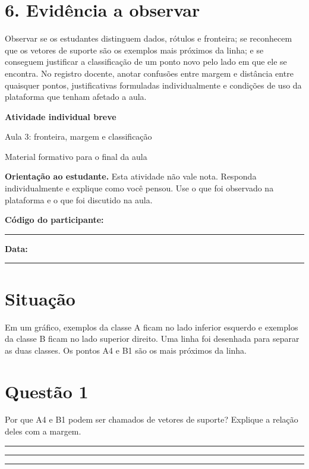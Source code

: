 \documentclass[12pt,a4paper]{article}
\newcommand{\linha}{\rule{\linewidth}{0.35pt}}
\newcommand{\bloco}[1]{%
  \vspace{0.25em}
  \noindent\colorbox{cinza}{\parbox{0.96\linewidth}{#1}}%
  \vspace{0.3em}
}
\begin{document}
\section*{6. Evidência a observar}

Observar se os estudantes distinguem dados, rótulos e fronteira; se reconhecem que os vetores de suporte são os exemplos mais próximos da linha; e se conseguem justificar a classificação de um ponto novo pelo lado em que ele se encontra. No registro docente, anotar confusões entre margem e distância entre quaisquer pontos, justificativas formuladas individualmente e condições de uso da plataforma que tenham afetado a aula.

\newpage

\begin{center}
  {\LARGE\bfseries\color{azul} Atividade individual breve}\par
  \vspace{0.2em}
  {\large Aula 3: fronteira, margem e classificação}\par
  \vspace{0.35em}
  {\small Material formativo para o final da aula}\par
\end{center}

\bloco{\textbf{Orientação ao estudante.} Esta atividade não vale nota. Responda individualmente e explique como você pensou. Use o que foi observado na plataforma e o que foi discutido na aula.}

\textbf{Código do participante:} \rule{5cm}{0.4pt}
\hfill
\textbf{Data:} \rule{3cm}{0.4pt}

\section*{Situação}

Em um gráfico, exemplos da classe A ficam no lado inferior esquerdo e exemplos da classe B ficam no lado superior direito. Uma linha foi desenhada para separar as duas classes. Os pontos A4 e B1 são os mais próximos da linha.

\section*{Questão 1}

Por que A4 e B1 podem ser chamados de vetores de suporte? Explique a relação deles com a margem.

\vspace{0.25em}
\linha\par\vspace{0.5em}
\linha\par\vspace{0.5em}
\linha
\end{document}
